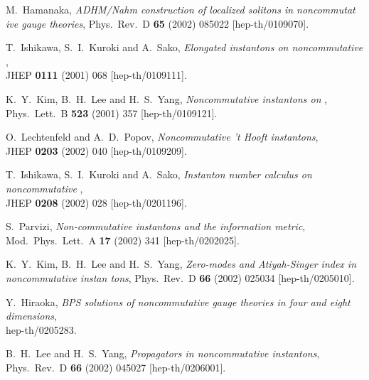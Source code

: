 \documentclass[a4paper,11pt,english]{article}
\numberwithin{equation}{section}
\renewcommand{\=}{\ =\ }
\begin{document}
\begin{thebibliography}{99}
         M.~Hamanaka,
         {\em ADHM/Nahm construction of localized solitons in noncommutat%
ive gauge theories},
         Phys.\ Rev.\ D {\bf 65} (2002) 085022
         [hep-th/0109070].

         T.~Ishikawa, S.~I.~Kuroki and A.~Sako,
         {\em Elongated \coordHE{} instantons on noncommutative \coordHE{}},\\
         JHEP {\bf 0111} (2001) 068
         [hep-th/0109111].

         K.~Y.~Kim, B.~H.~Lee and H.~S.~Yang,
         {\em Noncommutative instantons on 
              \coordHE{}},\\
         Phys.\ Lett.\ B {\bf 523} (2001) 357
         [hep-th/0109121].

         O.~Lechtenfeld and A.~D.~Popov,
         {\em Noncommutative 't Hooft instantons},\\
         JHEP {\bf 0203} (2002) 040
         [hep-th/0109209].

         T.~Ishikawa, S.~I.~Kuroki and A.~Sako,
         {\em Instanton number calculus on noncommutative \coordHE{}},\\
         JHEP {\bf 0208} (2002) 028
         [hep-th/0201196].

         S.~Parvizi,
         {\em Non-commutative instantons and the information metric},\\
         Mod.\ Phys.\ Lett.\ A {\bf 17} (2002) 341
         [hep-th/0202025].

         K.~Y.~Kim, B.~H.~Lee and H.~S.~Yang,
         {\em Zero-modes and Atiyah-Singer index in noncommutative instan%
tons},
         Phys.\ Rev.\ D {\bf 66} (2002) 025034
         [hep-th/0205010].

         Y.~Hiraoka,
         {\em BPS solutions of noncommutative gauge theories in four and %
eight dimensions},\\
         hep-th/0205283.

         B.~H.~Lee and H.~S.~Yang,
         {\em Propagators in noncommutative instantons},\\
         Phys.\ Rev.\ D {\bf 66} (2002) 045027
         [hep-th/0206001].


\end{thebibliography}
\end{document}
